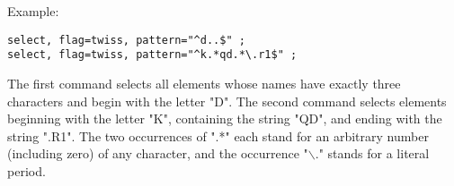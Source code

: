 Example: 
\begin{verbatim}
select, flag=twiss, pattern="^d..$" ;
select, flag=twiss, pattern="^k.*qd.*\.r1$" ;
\end{verbatim}
 
The first command selects all elements whose names have exactly three
characters and begin with the letter "D". The second command selects
elements beginning with the letter "K", containing the string "QD", and
ending with the string ".R1". The two occurrences of ".*" each stand for
an arbitrary number (including zero) of any character, and the
occurrence "$\backslash$." stands for a literal period.  




